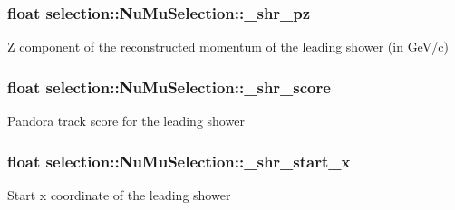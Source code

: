 \subsubsection[{\texorpdfstring{\+\_\+shr\+\_\+pz}{_shr_pz}}]{\setlength{\rightskip}{0pt plus 5cm}float selection\+::\+Nu\+Mu\+Selection\+::\+\_\+shr\+\_\+pz\hspace{0.3cm}{\ttfamily [private]}}\hypertarget{classselection_1_1NuMuSelection_ad9b6318a95801512e9ce04c3f61e11f9}{}\label{classselection_1_1NuMuSelection_ad9b6318a95801512e9ce04c3f61e11f9}
Z component of the reconstructed momentum of the leading shower (in Ge\+V/c) 
\subsubsection[{\texorpdfstring{\+\_\+shr\+\_\+score}{_shr_score}}]{\setlength{\rightskip}{0pt plus 5cm}float selection\+::\+Nu\+Mu\+Selection\+::\+\_\+shr\+\_\+score\hspace{0.3cm}{\ttfamily [private]}}\hypertarget{classselection_1_1NuMuSelection_a3aefddb8bd817a3ddd32076f1cf7b291}{}\label{classselection_1_1NuMuSelection_a3aefddb8bd817a3ddd32076f1cf7b291}
Pandora track score for the leading shower 
\subsubsection[{\texorpdfstring{\+\_\+shr\+\_\+start\+\_\+x}{_shr_start_x}}]{\setlength{\rightskip}{0pt plus 5cm}float selection\+::\+Nu\+Mu\+Selection\+::\+\_\+shr\+\_\+start\+\_\+x\hspace{0.3cm}{\ttfamily [private]}}\hypertarget{classselection_1_1NuMuSelection_af38dabc2591bc0a81c564db0bb773d2c}{}\label{classselection_1_1NuMuSelection_af38dabc2591bc0a81c564db0bb773d2c}
Start x coordinate of the leading shower 
